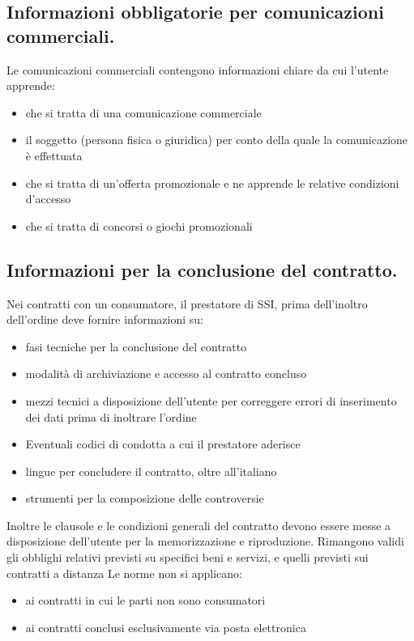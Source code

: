 \subsection{Informazioni obbligatorie per comunicazioni commerciali.}

Le comunicazioni commerciali contengono informazioni chiare da cui l'utente apprende:
\begin{itemize}
    \item che si tratta di una comunicazione commerciale
    \item il soggetto (persona fisica o giuridica) per conto della quale la comunicazione è effettuata
    \item che si tratta di un'offerta promozionale e ne apprende le relative condizioni d'accesso
    \item che si tratta di concorsi o giochi promozionali
\end{itemize}

\subsection{Informazioni per la conclusione del contratto.}
Nei contratti con un consumatore, il prestatore di SSI, prima dell'inoltro dell'ordine deve fornire informazioni su:
\begin{itemize}
    \item fasi tecniche per la conclusione del contratto
    \item modalità di archiviazione e accesso al contratto concluso
    \item mezzi tecnici a disposizione dell'utente per correggere errori di inserimento dei dati prima di inoltrare l'ordine
    \item Eventuali codici di condotta a cui il prestatore aderisce
    \item lingue per concludere il contratto, oltre all'italiano
    \item strumenti per la composizione delle controversie
\end{itemize}
Inoltre le clausole e le condizioni generali del contratto devono essere messe a disposizione dell'utente per la memorizzazione e riproduzione.
\newline
Rimangono validi gli obblighi relativi previsti su specifici beni e servizi, e quelli previsti sui contratti a distanza
\newline
Le norme non si applicano:
\begin{itemize}
    \item ai contratti in cui le parti non sono consumatori
    \item ai contratti conclusi esclusivamente via posta elettronica
\end{itemize}

